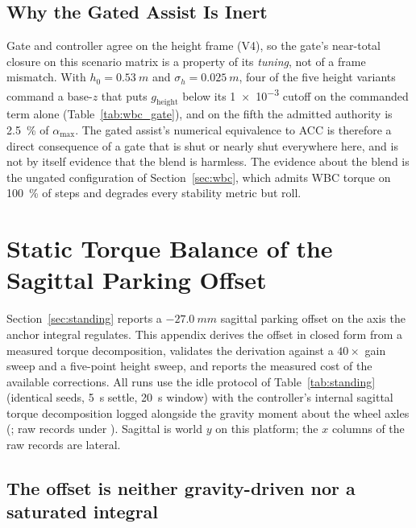 \documentclass[a4paper,fleqn]{cas-dc}
\begin{document}
\subsection{Why the Gated Assist Is Inert}

Gate and controller agree on the height frame (V4), so the gate's near-total
closure on this scenario matrix is a property of its \emph{tuning}, not of a
frame mismatch. With $h_0{=}\SI{0.53}{m}$ and $\sigma_h{=}\SI{0.025}{m}$, four of
the five height variants command a base-$z$ that puts $g_{\text{height}}$ below
its \num{1e-3} cutoff on the commanded term alone (Table~\ref{tab:wbc_gate}), and
on the fifth the admitted authority is \SI{2.5}{\percent} of $\alpha_{\max}$.
The gated assist's numerical equivalence to ACC is therefore a direct
consequence of a gate that is shut or nearly shut everywhere here, and is not by
itself evidence that the blend is harmless. The evidence about the blend is the
ungated configuration of Section~\ref{sec:wbc}, which admits WBC torque on
\SI{100}{\percent} of steps and degrades every stability metric but roll.

\section{Static Torque Balance of the Sagittal Parking Offset}
\label{sec:parking_supp}

Section~\ref{sec:standing} reports a $\SI{-27.0}{mm}$ sagittal parking offset on the axis the
anchor integral regulates. This appendix derives the offset in closed form from a measured torque
decomposition, validates the derivation against a $40{\times}$ gain sweep and
a five-point height sweep, and reports the measured cost of the available
corrections.
All runs use the idle protocol of Table~\ref{tab:standing} (identical seeds,
\SI{5}{s} settle, \SI{20}{s} window) with the controller's internal sagittal
torque decomposition logged alongside the gravity moment about the wheel axles
(; raw records under
). Sagittal is world $y$ on this
platform; the $x$ columns of the raw records are lateral.

\subsection{The offset is neither gravity-driven nor a saturated integral}
\end{document}

